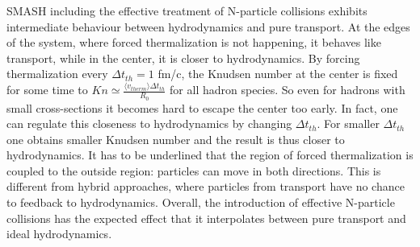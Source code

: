 SMASH including the effective treatment of N-particle collisions exhibits
intermediate behaviour between hydrodynamics and pure transport. At the edges
of the system, where forced thermalization is not happening, it behaves like
transport, while in the center, it is closer to hydrodynamics. By forcing
thermalization every $\Delta t_{th} = 1$ fm/c, the Knudsen number at the center
is fixed for some time to $Kn \simeq \frac{\langle v_{therm} \rangle \Delta
t_{th} }{R_0}$ for all hadron species. So even for hadrons with small
cross-sections it becomes hard to escape the center too early. In fact, one can
regulate this closeness to hydrodynamics by changing $\Delta t_{th}$. For
smaller $\Delta t_{th}$ one obtains smaller Knudsen number and the result is
thus closer to hydrodynamics. It has to be underlined that the region of forced
thermalization is coupled to the outside region: particles can move in both
directions. This is different from hybrid approaches, where particles from
transport have no chance to feedback to hydrodynamics. Overall, the
introduction of effective N-particle collisions has the expected effect that it
interpolates between pure transport and ideal hydrodynamics. 

